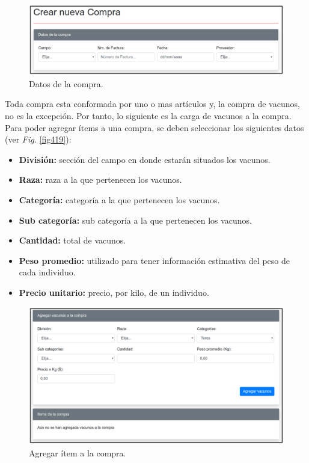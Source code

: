 \documentclass[11pt,oneside]{book}
\begin{document}
\begin{figure}[tbhp]
\centerline{\includegraphics[scale=0.87]{figs/capitulo_4_desarrollo/fig418.pdf}}
\caption{Datos de la compra.}
\label{fig418}
\end{figure}

Toda compra esta conformada por uno o mas artículos y, la compra de vacunos, no es la excepción. Por tanto, lo siguiente es la carga de vacunos a la compra. Para poder agregar ítems a una compra, se deben seleccionar los siguientes datos (ver \textit{Fig.} \eqref{fig419}):
\begin{itemize}
\item \textbf{División:} sección del campo en donde estarán situados los vacunos.
\item \textbf{Raza:} raza a la que pertenecen los vacunos.
\item \textbf{Categoría:} categoría a la que pertenecen los vacunos. 
\item \textbf{Sub categoría:} sub categoría a la que pertenecen los vacunos.
\item \textbf{Cantidad:} total de vacunos.
\item \textbf{Peso promedio:} utilizado para tener información estimativa del peso de cada individuo.
\item \textbf{Precio unitario:} precio, por kilo, de un individuo.
\end{itemize}

\begin{figure}[tbhp]
\centerline{\includegraphics[scale=0.87]{figs/capitulo_4_desarrollo/fig419.pdf}}
\caption{Agregar ítem a la compra.}
\label{fig419}
\end{figure}
\end{document}
